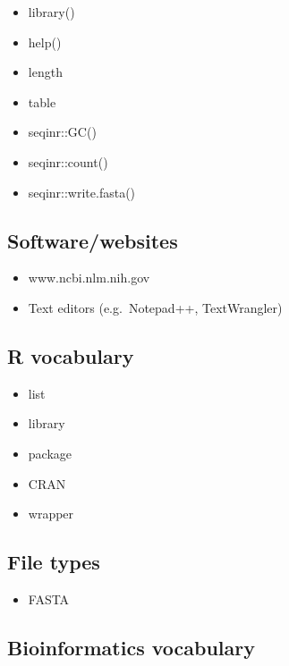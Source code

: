 \documentclass[
]{book}
\providecommand{\tightlist}{%
  \setlength{\itemsep}{0pt}\setlength{\parskip}{0pt}}
\begin{document}
\begin{itemize}
\tightlist
\item
  library()
\item
  help()
\item
  length
\item
  table
\item
  seqinr::GC()
\item
  seqinr::count()
\item
  seqinr::write.fasta()
\end{itemize}

\hypertarget{softwarewebsites}{%
\subsection{Software/websites}\label{softwarewebsites}}

\begin{itemize}
\tightlist
\item
  www.ncbi.nlm.nih.gov
\item
  Text editors (e.g.~Notepad++, TextWrangler)
\end{itemize}

\hypertarget{r-vocabulary}{%
\subsection{R vocabulary}\label{r-vocabulary}}

\begin{itemize}
\tightlist
\item
  list
\item
  library
\item
  package
\item
  CRAN
\item
  wrapper
\end{itemize}

\hypertarget{file-types}{%
\subsection{File types}\label{file-types}}

\begin{itemize}
\tightlist
\item
  FASTA
\end{itemize}

\hypertarget{bioinformatics-vocabulary}{%
\subsection{Bioinformatics vocabulary}\label{bioinformatics-vocabulary}}
\end{document}

